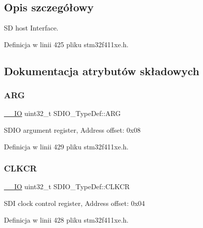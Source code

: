 \subsection{Opis szczegółowy}
SD host Interface. 

Definicja w linii 425 pliku stm32f411xe.\+h.



\subsection{Dokumentacja atrybutów składowych}
\mbox{\label{struct_s_d_i_o___type_def_a3e24392875e98cd09043e54a0990ab7a}} 
\subsubsection{\texorpdfstring{A\+RG}{ARG}}
{\footnotesize\ttfamily \hyperlink{core__sc300_8h_aec43007d9998a0a0e01faede4133d6be}{\+\_\+\+\_\+\+IO} uint32\+\_\+t S\+D\+I\+O\+\_\+\+Type\+Def\+::\+A\+RG}

S\+D\+IO argument register, Address offset\+: 0x08 

Definicja w linii 429 pliku stm32f411xe.\+h.

\mbox{\label{struct_s_d_i_o___type_def_aeb1e30ce2038628e45264f75e5e926bb}} 
\subsubsection{\texorpdfstring{C\+L\+K\+CR}{CLKCR}}
{\footnotesize\ttfamily \hyperlink{core__sc300_8h_aec43007d9998a0a0e01faede4133d6be}{\+\_\+\+\_\+\+IO} uint32\+\_\+t S\+D\+I\+O\+\_\+\+Type\+Def\+::\+C\+L\+K\+CR}

S\+DI clock control register, Address offset\+: 0x04 

Definicja w linii 428 pliku stm32f411xe.\+h.

\mbox{\label{struct_s_d_i_o___type_def_abbbdc3174e12dab21123d746d65f345d}} 
